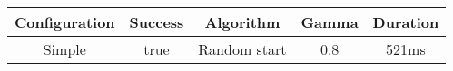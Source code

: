 \begin{tabular}{|c|c|c|c|c|}
\hline
Configuration & Success & Algorithm & Gamma & Duration\\
\hline
Simple & true & Random start & 0.8 & 521ms\\
\hline
\end{tabular}